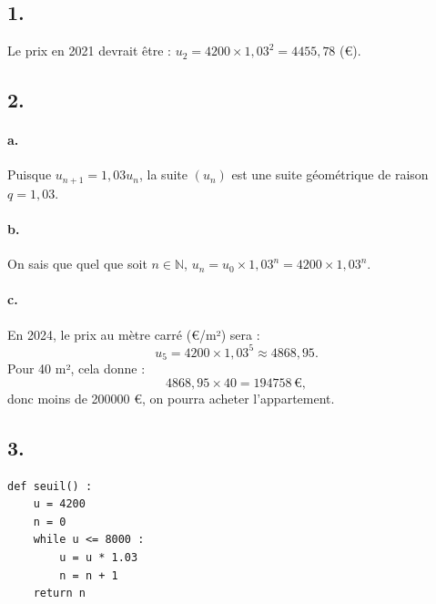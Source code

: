 \subsection*{1.}

Le prix en 2021 devrait être : \(u_2 = 4200 \times 1{,}03^2 = 4455{,}78\) (€).

\subsection*{2.}

\paragraph{a.} Puisque \( u_{n + 1} = 1{,}03u_n \), la suite \((u_n)\) est une suite géométrique de raison \(q = 1{,}03\).

\paragraph{b.} On sais que quel que soit \(n \in \mathbb{N}\), \(u_n = u_0 \times 1{,}03^n = 4200 \times 1{,}03^n\).

\paragraph{c.} En 2024, le prix au mètre carré (€/m²) sera :
\[
u_5 = 4200 \times 1{,}03^5 \approx 4868{,}95.
\]
Pour 40 m², cela donne :
\[
4868{,}95 \times 40 = 194758 \, \text{€},
\]
donc moins de 200000 €, on pourra acheter l'appartement.

\subsection*{3.}

\begin{center}
\begin{lstlisting}[style=python]
def seuil() :
    u = 4200
    n = 0
    while u <= 8000 :
        u = u * 1.03
        n = n + 1
    return n
\end{lstlisting}
\end{center}
